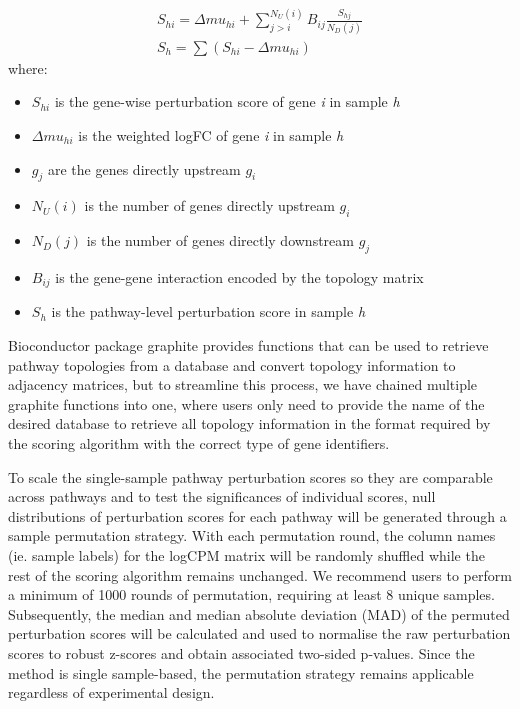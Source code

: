 \documentclass[9pt,a4paper,]{extarticle}
\begin{document}
\[
\begin{aligned}
S_{hi} = \Delta mu_{hi} + \sum_{j > i}^{N_{U}(i)} B_{ij} \frac{S_{hj}}{N_{D}(j)} \\
S_{h} = \sum (S_{hi} - \Delta mu_{hi})
\end{aligned}
\]
where:

\begin{itemize}
\item
  \(S_{hi}\) is the gene-wise perturbation score of gene \emph{i} in sample \emph{h}
\item
  \(\Delta mu_{hi}\) is the weighted logFC of gene \emph{i} in sample \emph{h}
\item
  \(g_j\) are the genes directly upstream \(g_i\)
\item
  \(N_{U}(i)\) is the number of genes directly upstream \(g_i\)
\item
  \(N_{D}(j)\) is the number of genes directly downstream \(g_j\)
\item
  \(B_{ij}\) is the gene-gene interaction encoded by the topology matrix
\item
  \(S_{h}\) is the pathway-level perturbation score in sample \emph{h}
\end{itemize}

Bioconductor package graphite\citep{Sales2012} provides functions that can be used to retrieve pathway topologies from a database and convert topology information to adjacency matrices, but to streamline this process, we have chained multiple graphite functions into one, where users only need to provide the name of the desired database to retrieve all topology information in the format required by the scoring algorithm with the correct type of gene identifiers.

To scale the single-sample pathway perturbation scores so they are comparable across pathways and to test the significances of individual scores, null distributions of perturbation scores for each pathway will be generated through a sample permutation strategy. With each permutation round, the column names (ie. sample labels) for the logCPM matrix will be randomly shuffled while the rest of the scoring algorithm remains unchanged. We recommend users to perform a minimum of 1000 rounds of permutation, requiring at least 8 unique samples. Subsequently, the median and median absolute deviation (MAD) of the permuted perturbation scores will be calculated and used to normalise the raw perturbation scores to robust z-scores and obtain associated two-sided p-values. Since the method is single sample-based, the permutation strategy remains applicable regardless of experimental design.
\end{document}
